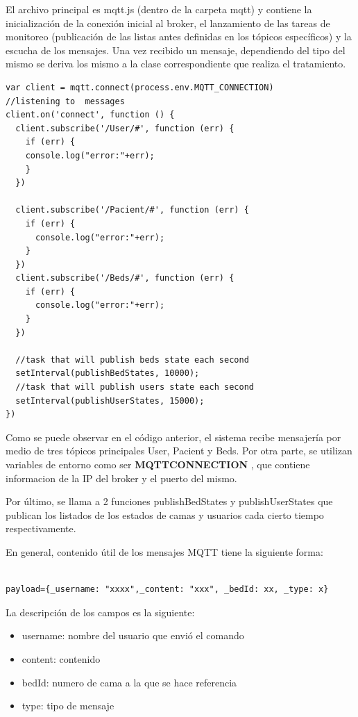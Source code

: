 El archivo principal es mqtt.js (dentro de la carpeta mqtt) y contiene la inicialización de la conexión inicial al broker, el lanzamiento de las tareas de monitoreo (publicación de las listas antes definidas en los tópicos específicos) y la escucha de los mensajes. Una vez recibido un mensaje, dependiendo del tipo del mismo se deriva los mismo a la clase correspondiente que realiza el tratamiento.


\begin{lstlisting}[caption=  Tareas ejecutadas por mqtt.js]
var client = mqtt.connect(process.env.MQTT_CONNECTION)
//listening to  messages
client.on('connect', function () {
  client.subscribe('/User/#', function (err) {
    if (err) {
    console.log("error:"+err);
    }
  })

  client.subscribe('/Pacient/#', function (err) {
    if (err) {      
      console.log("error:"+err);
    }
  })
  client.subscribe('/Beds/#', function (err) {
    if (err) {      
      console.log("error:"+err);
    }
  })

  //task that will publish beds state each second
  setInterval(publishBedStates, 10000);
  //task that will publish users state each second
  setInterval(publishUserStates, 15000);
})
\end{lstlisting}

Como se puede observar en el código anterior, el sistema recibe mensajería por medio de tres tópicos principales User, Pacient y Beds. Por otra parte, se utilizan variables de entorno como ser \textbf{MQTT\textunderscore CONNECTION}  , que contiene informacion de la IP del broker y el puerto del mismo.

Por último, se llama a 2 funciones publishBedStates y publishUserStates que publican los listados de los estados de camas y usuarios cada cierto tiempo respectivamente.


En general, contenido útil de los mensajes MQTT tiene la siguiente forma:

\begin{lstlisting}[caption=  Formato mensaje MQTT]

payload={_username: "xxxx",_content: "xxx", _bedId: xx, _type: x}

\end{lstlisting}

La descripción de los campos es la siguiente:
\begin{itemize}
\item \textunderscore username: nombre del usuario que envió el comando
\item \textunderscore content: contenido
\item \textunderscore bedId: numero de cama a la que se hace referencia
\item \textunderscore type: tipo de mensaje
\end{itemize}

